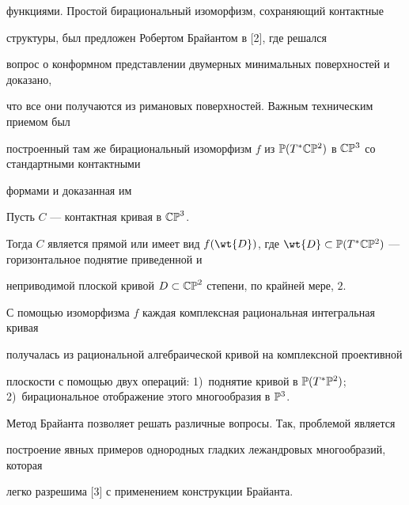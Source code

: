 функциями. Простой бирациональный изоморфизм, сохраняющий контактные 


структуры, был предложен Робертом Брайантом в [2], где решался 


вопрос о конформном представлении двумерных минимальных поверхностей и доказано, 


что все они получаются из римановых поверхностей. Важным техническим приемом был 


построенный там же бирациональный изоморфизм $f$ из $\Bbb{P}(T^{\ast}\Bbb{C}


\Bbb{P}^2)$ в $\Bbb{C}\Bbb{P}^3$ со стандартными контактными 


формами и доказанная им








\begin{thm} 


Пусть $C$ --- контактная кривая в $\Bbb{CP}^3$. 


Тогда $C$ является прямой или имеет вид $f(\wt{D})$, где  $\wt{D}\subset\Bbb{P}


(T^{\ast}\Bbb{C}\Bbb{P}^2)$ --- горизонтальное поднятие приведенной и 


неприводимой плоской кривой $D\subset\Bbb{CP}^2$  степени, по крайней мере, $2$.


\end{thm}





С помощью изоморфизма $f$ каждая комплексная рациональная интегральная кривая 


получалась из рациональной алгебраической кривой на комплексной проективной 


плоскости с помощью двух операций: 1)~поднятие кривой в $\Bbb{P}(T^{\ast}


\Bbb{P}^2)$; 2)~бирациональное отображение этого многообразия в $\Bbb{P}^3$.





Метод Брайанта позволяет решать различные вопросы. Так, проблемой является 


построение явных примеров однородных гладких лежандровых многообразий, которая 


легко разрешима [3] с применением конструкции Брайанта.





